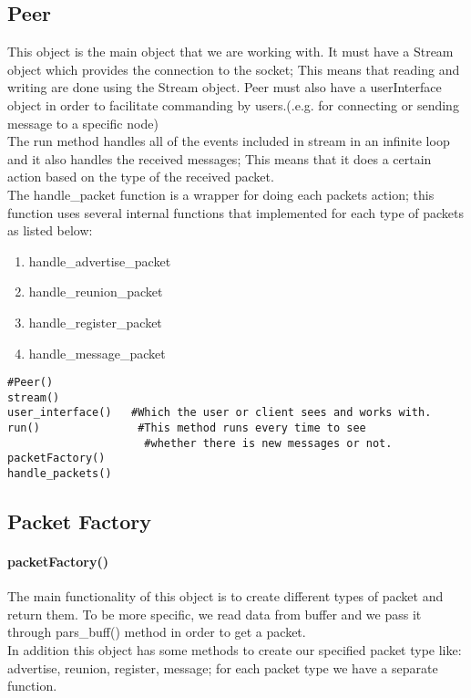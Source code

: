 \documentclass{article}
\begin{document}
\subsection{Peer}This object is the main object that we are working with. It must have a Stream object which provides the connection to the socket; This means that reading and writing are done using the Stream object. Peer must also have a userInterface object in order to facilitate commanding by users.(.e.g. for connecting or sending message to a specific node)\\
The run method handles all of the events included in stream in an infinite loop and it also handles the received messages; This means that it does a certain action based on the type of the received packet.
\\
The handle\_packet function is a wrapper for doing each packets action; this function uses several internal functions that implemented for each type of packets as listed below:
\\
\begin{enumerate}
  \item handle\_advertise\_packet
  \item handle\_reunion\_packet
  \item handle\_register\_packet
  \item handle\_message\_packet
\end{enumerate}

\begin{lstlisting}
#Peer()
stream()
user_interface()   #Which the user or client sees and works with.
run() 				#This method runs every time to see
				     #whether there is new messages or not.
packetFactory()
handle_packets()
\end{lstlisting}
\subsection{Packet Factory}
\paragraph{packetFactory()}The main functionality of this object is to create different types of packet and return them. To be more specific, we read data from buffer and we pass it through pars\_buff() method in order to get a packet.
\\
In addition this object has some methods to create our specified packet type like: advertise, reunion, register, message; for each packet type we have a separate function.
\end{document}
